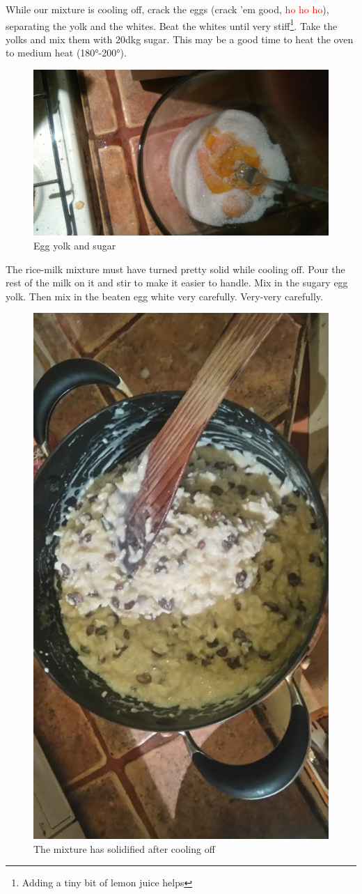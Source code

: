 \documentclass{article}
\begin{document}
While our mixture is cooling off, crack the eggs (crack 'em good, \textcolor{red}{ho ho ho}), separating the yolk and the whites. Beat the whites until very stiff\footnote{Adding a tiny bit of lemon juice helps}. Take the yolks and mix them with 20dkg sugar. This may be a good time to heat the oven to medium heat (\ang{180}-\ang{200}).

\begin{figure}[!htbp]
\includegraphics[width=\textwidth]{rizskoch_08}
\caption{Egg yolk and sugar}
\end{figure}

The rice-milk mixture must have turned pretty solid while cooling off. Pour the rest of the milk on it and stir to make it easier to handle. Mix in the sugary egg yolk. Then mix in the beaten egg white very carefully. Very-very carefully.

\begin{figure}[!htbp]
\centering
\includegraphics[height=\textwidth]{rizskoch_13}
\caption{The mixture has solidified after cooling off}
\end{figure}
\end{document}
